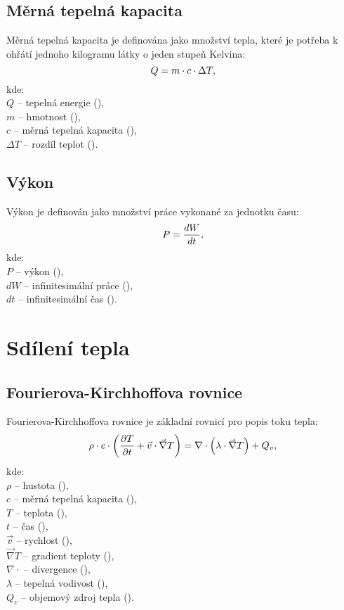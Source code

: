 \documentclass{article}
\begin{document}
\subsection{Měrná tepelná kapacita}
Měrná tepelná kapacita je definována jako množství tepla, které je potřeba k ohřátí jednoho kilogramu látky o jeden stupeň Kelvina:
\begin{equation}
    Q = m \cdot c \cdot \Delta T,
    \tagaddtext{(\ueqJ)}
\end{equation}
kde:\\
$Q$ -- tepelná energie (\ueqJ),\\
$m$ -- hmotnost (\ueqKG),\\
$c$ -- měrná tepelná kapacita (\ueqJandKGinvKinv),\\
$\Delta T$ -- rozdíl teplot (\ueqK).


\subsection{Výkon}
Výkon je definován jako množství práce vykonané za jednotku času:
\begin{equation}
    P = \frac{dW}{dt},
    \tagaddtext{(\ueqW)}
\end{equation}
kde:\\
$P$ -- výkon (\ueqW),\\
$dW$ -- infinitesimální práce (\ueqJ),\\
$dt$ -- infinitesimální čas (\ueqS).

\newpage



\section{Sdílení tepla}


\subsection{Fourierova-Kirchhoffova rovnice}
Fourierova-Kirchhoffova rovnice je základní rovnicí pro popis toku tepla:
\begin{equation}
    \rho \cdot c \cdot \left( \frac{\partial T}{\partial t} + \vec{v} \cdot \vec{\nabla} T \right) = \nabla \cdot \left( \lambda \cdot \vec{\nabla} T \right) + Q_v,
    \tagaddtext{(\ueqWandMinvcu)}
\end{equation}
kde:\\
$\rho$ -- hustota (\ueqKGandMinvcu),\\
$c$ -- měrná tepelná kapacita (\ueqJandKGinvKinv),\\
$T$ -- teplota (\ueqK),\\
$t$ -- čas (\ueqS),\\
$\vec{v}$ -- rychlost (\ueqMandSinv),\\
$\vec{\nabla} T$ -- gradient teploty (\ueqKandMinv),\\
$\nabla \cdot$ -- divergence (\ueqMinv),\\
$\lambda$ -- tepelná vodivost (\ueqWandMinvKinv),\\
$Q_v$ -- objemový zdroj tepla (\ueqWandMinvcu).
\end{document}
